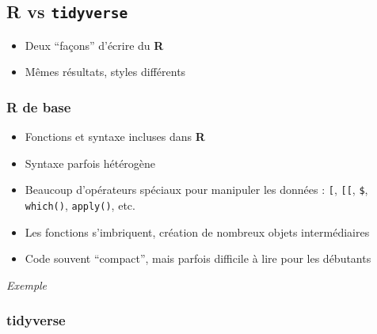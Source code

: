 \documentclass[
  french,
  10pt,
  a4paper,
]{article}
\newenvironment{Shaded}{}{}
\newcommand{\CommentTok}[1]{\textcolor[rgb]{0.63,0.63,0.65}{\textit{#1}}}
\newcommand{\DecValTok}[1]{\textcolor[rgb]{0.60,0.41,0.00}{#1}}
\newcommand{\FunctionTok}[1]{\textcolor[rgb]{0.25,0.47,0.95}{#1}}
\newcommand{\NormalTok}[1]{\textcolor[rgb]{0.22,0.23,0.26}{#1}}
\newcommand{\OtherTok}[1]{\textcolor[rgb]{0.15,0.68,0.38}{#1}}
\newcommand{\SpecialCharTok}[1]{\textcolor[rgb]{0.00,0.52,0.74}{#1}}
\providecommand{\tightlist}{%
  \setlength{\itemsep}{0pt}\setlength{\parskip}{0pt}}
\begin{document}
\subsection{\texorpdfstring{\textbf{R} vs
\texttt{tidyverse}}{R vs tidyverse}}\label{r-vs-tidyverse}

\begin{itemize}
\tightlist
\item
  Deux ``façons'' d'écrire du \textbf{R}
\item
  Mêmes résultats, styles différents
\end{itemize}

\subsubsection{\texorpdfstring{\textbf{R} de
base}{R de base}}\label{r-de-base}

\begin{itemize}
\tightlist
\item
  Fonctions et syntaxe incluses dans \textbf{R}
\item
  Syntaxe parfois hétérogène
\item
  Beaucoup d'opérateurs spéciaux pour manipuler les données :
  \texttt{{[}}, \texttt{{[}{[}}, \texttt{\$}, \texttt{which()},
  \texttt{apply()}, etc.
\item
  Les fonctions s'imbriquent, création de nombreux objets intermédiaires
\item
  Code souvent ``compact'', mais parfois difficile à lire pour les
  débutants
\end{itemize}

\emph{Exemple}

\begin{Shaded}
\end{Shaded}

\subsubsection{tidyverse}\label{tidyverse}
\end{document}

